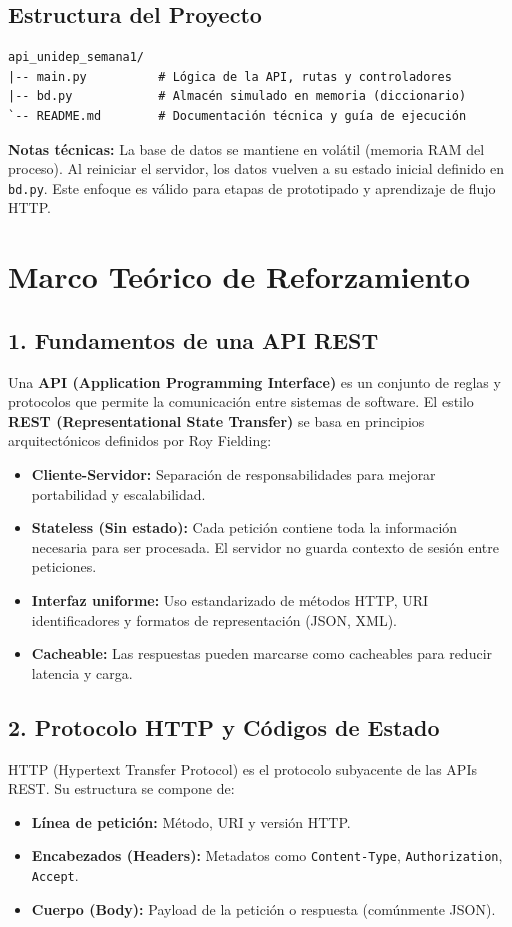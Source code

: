 \documentclass[12pt,a4paper]{article}
\begin{document}
\subsection*{Estructura del Proyecto}
\begin{verbatim}
api_unidep_semana1/
|-- main.py          # Lógica de la API, rutas y controladores
|-- bd.py            # Almacén simulado en memoria (diccionario)
`-- README.md        # Documentación técnica y guía de ejecución
\end{verbatim}

\textbf{Notas técnicas:} La base de datos se mantiene en volátil (memoria RAM del proceso). Al reiniciar el servidor, los datos vuelven a su estado inicial definido en \texttt{bd.py}. Este enfoque es válido para etapas de prototipado y aprendizaje de flujo HTTP.

\section*{Marco Teórico de Reforzamiento}

\subsection*{1. Fundamentos de una API REST}
Una \textbf{API (Application Programming Interface)} es un conjunto de reglas y protocolos que permite la comunicación entre sistemas de software. El estilo \textbf{REST (Representational State Transfer)} se basa en principios arquitectónicos definidos por Roy Fielding:
\begin{itemize}
    \item \textbf{Cliente-Servidor:} Separación de responsabilidades para mejorar portabilidad y escalabilidad.
    \item \textbf{Stateless (Sin estado):} Cada petición contiene toda la información necesaria para ser procesada. El servidor no guarda contexto de sesión entre peticiones.
    \item \textbf{Interfaz uniforme:} Uso estandarizado de métodos HTTP, URI identificadores y formatos de representación (JSON, XML).
    \item \textbf{Cacheable:} Las respuestas pueden marcarse como cacheables para reducir latencia y carga.
\end{itemize}

\subsection*{2. Protocolo HTTP y Códigos de Estado}
HTTP (Hypertext Transfer Protocol) es el protocolo subyacente de las APIs REST. Su estructura se compone de:
\begin{itemize}
    \item \textbf{Línea de petición:} Método, URI y versión HTTP.
    \item \textbf{Encabezados (Headers):} Metadatos como \texttt{Content-Type}, \texttt{Authorization}, \texttt{Accept}.
    \item \textbf{Cuerpo (Body):} Payload de la petición o respuesta (comúnmente JSON).
\end{itemize}
\end{document}
